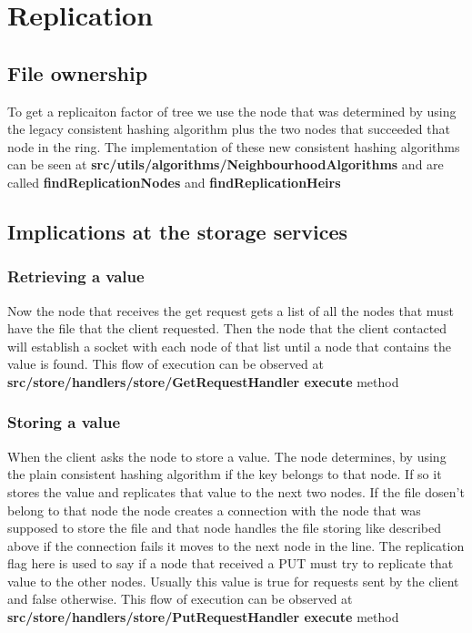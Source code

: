 \section{Replication}

\subsection{File ownership}
To get a replicaiton factor of tree we use the node that was determined by using the legacy consistent hashing algorithm plus the two nodes that succeeded that node in the ring. The implementation of these new consistent hashing algorithms can be seen at \textbf{src/utils/algorithms/NeighbourhoodAlgorithms} and are called \textbf{findReplicationNodes} and \textbf{findReplicationHeirs} 

\subsection{Implications at the storage services}
\subsubsection{Retrieving a value}
Now the node that receives the get request gets a list of all the nodes that must have the file that the client requested. Then the node that the client contacted will establish a socket with each node of that list until a node that contains the value is found. This flow of execution can be observed at \textbf{src/store/handlers/store/GetRequestHandler execute} method

\subsubsection{Storing a value}
When the client asks the node to store a value. The node determines, by using the plain consistent hashing algorithm if the key belongs to that node. If so it stores the value and replicates that value to the next two nodes. If the file dosen't belong to that node the node creates a connection with the node that was supposed to store the file and that node handles the file storing like described above if the connection fails it moves to the next node in the line. The replication flag here is used to say if a node that received a PUT must try to replicate that value to the other nodes. Usually this value is true for requests sent by the client and false otherwise. This flow of execution can be observed at \textbf{src/store/handlers/store/PutRequestHandler execute} method

